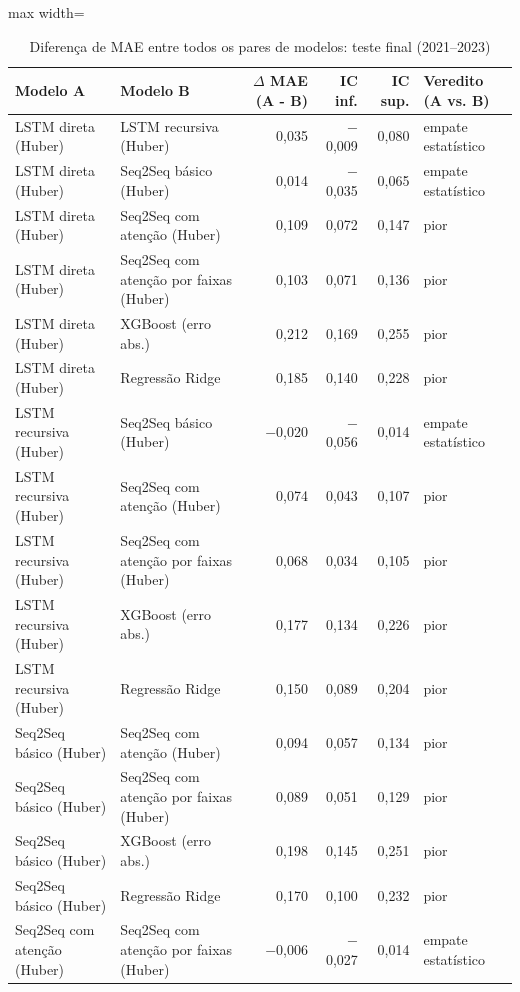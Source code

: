 \begin{table}[!htbp]
    \centering
    \caption{Diferença de MAE entre todos os pares de modelos: teste final (2021--2023)}
    \label{tab:matriz_holdout}
    \small
    \begin{adjustbox}{max width=\textwidth}
    \begin{tabular}{llrrrl}
        \toprule
        Modelo A & Modelo B & $\Delta$ MAE (A - B) & IC inf. & IC sup. & Veredito (A vs. B) \\
        \midrule
        LSTM direta (Huber) & LSTM recursiva (Huber) & 0,035 & $-$0,009 & 0,080 & empate estatístico \\
        LSTM direta (Huber) & Seq2Seq básico (Huber) & 0,014 & $-$0,035 & 0,065 & empate estatístico \\
        LSTM direta (Huber) & Seq2Seq com atenção (Huber) & 0,109 & 0,072 & 0,147 & pior \\
        LSTM direta (Huber) & Seq2Seq com atenção por faixas (Huber) & 0,103 & 0,071 & 0,136 & pior \\
        LSTM direta (Huber) & XGBoost (erro abs.) & 0,212 & 0,169 & 0,255 & pior \\
        LSTM direta (Huber) & Regressão Ridge & 0,185 & 0,140 & 0,228 & pior \\
        LSTM recursiva (Huber) & Seq2Seq básico (Huber) & $-$0,020 & $-$0,056 & 0,014 & empate estatístico \\
        LSTM recursiva (Huber) & Seq2Seq com atenção (Huber) & 0,074 & 0,043 & 0,107 & pior \\
        LSTM recursiva (Huber) & Seq2Seq com atenção por faixas (Huber) & 0,068 & 0,034 & 0,105 & pior \\
        LSTM recursiva (Huber) & XGBoost (erro abs.) & 0,177 & 0,134 & 0,226 & pior \\
        LSTM recursiva (Huber) & Regressão Ridge & 0,150 & 0,089 & 0,204 & pior \\
        Seq2Seq básico (Huber) & Seq2Seq com atenção (Huber) & 0,094 & 0,057 & 0,134 & pior \\
        Seq2Seq básico (Huber) & Seq2Seq com atenção por faixas (Huber) & 0,089 & 0,051 & 0,129 & pior \\
        Seq2Seq básico (Huber) & XGBoost (erro abs.) & 0,198 & 0,145 & 0,251 & pior \\
        Seq2Seq básico (Huber) & Regressão Ridge & 0,170 & 0,100 & 0,232 & pior \\
        Seq2Seq com atenção (Huber) & Seq2Seq com atenção por faixas (Huber) & $-$0,006 & $-$0,027 & 0,014 & empate estatístico \\

\end{tabular}
\end{adjustbox}
\end{table}
